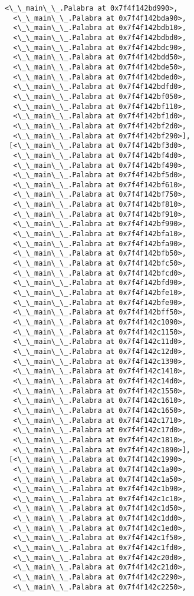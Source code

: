 \documentclass[12pt,a4paper,table]{article}
\begin{document}
\begin{tcolorbox}[breakable, size=fbox, boxrule=.5pt, pad at break*=1mm, opacityfill=0]
\begin{Verbatim}[commandchars=\\\{\}]
  <\_\_main\_\_.Palabra at 0x7f4f142bd990>,
  <\_\_main\_\_.Palabra at 0x7f4f142bda90>,
  <\_\_main\_\_.Palabra at 0x7f4f142bdb10>,
  <\_\_main\_\_.Palabra at 0x7f4f142bdbd0>,
  <\_\_main\_\_.Palabra at 0x7f4f142bdc90>,
  <\_\_main\_\_.Palabra at 0x7f4f142bdd50>,
  <\_\_main\_\_.Palabra at 0x7f4f142bde50>,
  <\_\_main\_\_.Palabra at 0x7f4f142bded0>,
  <\_\_main\_\_.Palabra at 0x7f4f142bdfd0>,
  <\_\_main\_\_.Palabra at 0x7f4f142bf050>,
  <\_\_main\_\_.Palabra at 0x7f4f142bf110>,
  <\_\_main\_\_.Palabra at 0x7f4f142bf1d0>,
  <\_\_main\_\_.Palabra at 0x7f4f142bf2d0>,
  <\_\_main\_\_.Palabra at 0x7f4f142bf290>],
 [<\_\_main\_\_.Palabra at 0x7f4f142bf3d0>,
  <\_\_main\_\_.Palabra at 0x7f4f142bf4d0>,
  <\_\_main\_\_.Palabra at 0x7f4f142bf490>,
  <\_\_main\_\_.Palabra at 0x7f4f142bf5d0>,
  <\_\_main\_\_.Palabra at 0x7f4f142bf610>,
  <\_\_main\_\_.Palabra at 0x7f4f142bf750>,
  <\_\_main\_\_.Palabra at 0x7f4f142bf810>,
  <\_\_main\_\_.Palabra at 0x7f4f142bf910>,
  <\_\_main\_\_.Palabra at 0x7f4f142bf990>,
  <\_\_main\_\_.Palabra at 0x7f4f142bfa10>,
  <\_\_main\_\_.Palabra at 0x7f4f142bfa90>,
  <\_\_main\_\_.Palabra at 0x7f4f142bfb50>,
  <\_\_main\_\_.Palabra at 0x7f4f142bfc50>,
  <\_\_main\_\_.Palabra at 0x7f4f142bfcd0>,
  <\_\_main\_\_.Palabra at 0x7f4f142bfd90>,
  <\_\_main\_\_.Palabra at 0x7f4f142bfe10>,
  <\_\_main\_\_.Palabra at 0x7f4f142bfe90>,
  <\_\_main\_\_.Palabra at 0x7f4f142bff50>,
  <\_\_main\_\_.Palabra at 0x7f4f142c1090>,
  <\_\_main\_\_.Palabra at 0x7f4f142c1150>,
  <\_\_main\_\_.Palabra at 0x7f4f142c11d0>,
  <\_\_main\_\_.Palabra at 0x7f4f142c12d0>,
  <\_\_main\_\_.Palabra at 0x7f4f142c1390>,
  <\_\_main\_\_.Palabra at 0x7f4f142c1410>,
  <\_\_main\_\_.Palabra at 0x7f4f142c14d0>,
  <\_\_main\_\_.Palabra at 0x7f4f142c1550>,
  <\_\_main\_\_.Palabra at 0x7f4f142c1610>,
  <\_\_main\_\_.Palabra at 0x7f4f142c1650>,
  <\_\_main\_\_.Palabra at 0x7f4f142c1710>,
  <\_\_main\_\_.Palabra at 0x7f4f142c17d0>,
  <\_\_main\_\_.Palabra at 0x7f4f142c1810>,
  <\_\_main\_\_.Palabra at 0x7f4f142c1890>],
 [<\_\_main\_\_.Palabra at 0x7f4f142c1990>,
  <\_\_main\_\_.Palabra at 0x7f4f142c1a90>,
  <\_\_main\_\_.Palabra at 0x7f4f142c1a50>,
  <\_\_main\_\_.Palabra at 0x7f4f142c1b90>,
  <\_\_main\_\_.Palabra at 0x7f4f142c1c10>,
  <\_\_main\_\_.Palabra at 0x7f4f142c1d50>,
  <\_\_main\_\_.Palabra at 0x7f4f142c1dd0>,
  <\_\_main\_\_.Palabra at 0x7f4f142c1ed0>,
  <\_\_main\_\_.Palabra at 0x7f4f142c1f50>,
  <\_\_main\_\_.Palabra at 0x7f4f142c1fd0>,
  <\_\_main\_\_.Palabra at 0x7f4f142c20d0>,
  <\_\_main\_\_.Palabra at 0x7f4f142c21d0>,
  <\_\_main\_\_.Palabra at 0x7f4f142c2290>,
  <\_\_main\_\_.Palabra at 0x7f4f142c2250>,

\end{Verbatim}
\end{tcolorbox}
\end{document}
